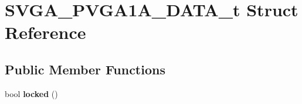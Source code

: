 \hypertarget{structSVGA__PVGA1A__DATA__t}{\section{S\-V\-G\-A\-\_\-\-P\-V\-G\-A1\-A\-\_\-\-D\-A\-T\-A\-\_\-t Struct Reference}
\label{structSVGA__PVGA1A__DATA__t}
}
\subsection*{Public Member Functions}
\begin{DoxyCompactItemize}
\item 
\hypertarget{structSVGA__PVGA1A__DATA__t_a3197b324e8726d8b87f7965a498a7018}{bool {\bfseries locked} ()}\label{structSVGA__PVGA1A__DATA__t_a3197b324e8726d8b87f7965a498a7018}

\end{DoxyCompactItemize}

